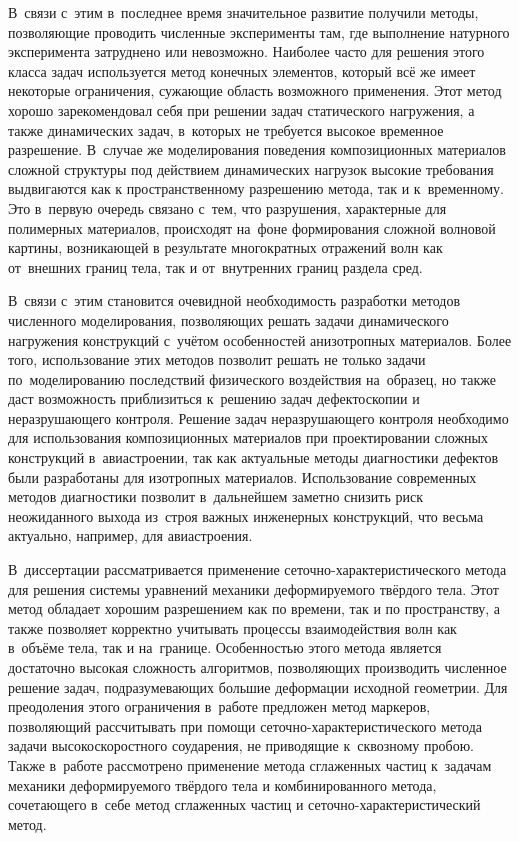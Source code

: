 \documentclass[a4paper,14pt]{extarticle}
\numberwithin{equation}{section}
\begin{document}
    В~связи с~этим в~последнее время значительное развитие получили методы, позволяющие проводить численные
    эксперименты там, где выполнение натурного эксперимента затруднено или невозможно. Наиболее часто для решения этого
    класса задач используется метод конечных элементов, который всё же имеет некоторые ограничения, сужающие
    область возможного применения. Этот метод хорошо зарекомендовал себя при решении задач статического нагружения, а
    также динамических задач, в~которых не требуется высокое временное разрешение. В~случае же моделирования поведения
    композиционных материалов сложной структуры под действием динамических нагрузок высокие требования выдвигаются как к
    пространственному разрешению метода, так и к~временному. Это в~первую очередь связано с~тем, что разрушения,
    характерные для полимерных материалов, происходят на~фоне формирования сложной волновой картины, возникающей в
    результате многократных отражений волн как от~внешних границ тела, так и от~внутренних границ раздела сред.

    В~связи с~этим становится очевидной необходимость разработки методов численного моделирования, позволяющих решать
    задачи динамического нагружения конструкций с~учётом особенностей анизотропных материалов. Более того, использование
    этих методов позволит решать не только задачи по~моделированию последствий физического воздействия на~образец, но
    также даст возможность приблизиться к~решению задач дефектоскопии и неразрушающего контроля. Решение задач неразрушающего
    контроля необходимо для использования композиционных материалов при проектировании сложных
    конструкций в~авиастроении, так как актуальные методы диагностики дефектов были разработаны для изотропных
    материалов. Использование современных методов диагностики позволит в~дальнейшем заметно снизить риск неожиданного
    выхода из~строя важных инженерных конструкций, что весьма актуально, например, для авиастроения.

    В~диссертации рассматривается применение сеточно-характеристичес\-ко\-го метода для решения системы уравнений
    механики деформируемого твёрдого тела. Этот метод обладает хорошим разрешением как по времени, так и по
    пространству, а также позволяет корректно учитывать процессы взаимодействия волн как в~объёме тела, так и
    на~границе. Особенностью этого метода является достаточно высокая сложность алгоритмов, позволяющих производить
    численное решение задач, подразумевающих большие деформации исходной геометрии. Для преодоления этого
    ограничения в~работе предложен метод маркеров, позволяющий рассчитывать при помощи сеточно-характеристического
    метода задачи высокоскоростного соударения, не приводящие к~сквозному пробою. Также в~работе рассмотрено применение метода
    сглаженных частиц к~задачам механики деформируемого твёрдого тела и комбинированного метода, сочетающего
    в~себе метод сглаженных частиц и сеточно-характеристический метод.
\end{document}
